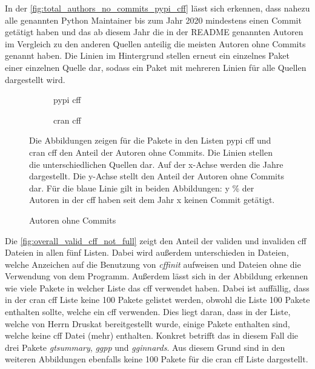 In der \autoref{fig:total_authors_no_commits_pypi_cff} lässt sich erkennen, dass nahezu alle genannten Python Maintainer bis zum Jahr 2020 mindestens einen Commit getätigt haben und das ab diesem Jahr die in der README genannten Autoren im Vergleich zu den anderen Quellen anteilig die meisten Autoren ohne Commits genannt haben.
Die Linien im Hintergrund stellen erneut ein einzelnes Paket einer einzelnen Quelle dar, sodass ein Paket mit mehreren Linien für alle Quellen dargestellt wird.

\begin{figure}
    \begin{subfigure}{.5\textwidth}
        \centering
        
        \caption{\gls{pypi} \gls{cff}}
        \label{fig:total_authors_no_commits_pypi_cff}
    \end{subfigure}%
    \begin{subfigure}{.5\textwidth}
        \centering
        
        \caption{\gls{cran} \gls{cff}}
        \label{fig:total_authors_no_commits_cran_cff}
    \end{subfigure}
    \caption{Autoren ohne Commits}
    \label{fig:total_authors_no_commits}
    \small
    \raggedright
    Die Abbildungen zeigen für die Pakete in den Listen \gls{pypi} \gls{cff} und \gls{cran} \gls{cff} den Anteil der Autoren ohne Commits. Die Linien stellen die unterschiedlichen Quellen dar. Auf der x-Achse werden die Jahre dargestellt. Die y-Achse stellt den Anteil der Autoren ohne Commits dar. Für die blaue Linie gilt in beiden Abbildungen: y \% der Autoren in der \gls{cff} haben seit dem Jahr x keinen Commit getätigt.
\end{figure}

Die \autoref{fig:overall_valid_cff_not_full} zeigt den Anteil der validen und invaliden \gls{cff} Dateien in allen fünf Listen.
Dabei wird außerdem unterschieden in Dateien, welche Anzeichen auf die Benutzung von \emph{cffinit} aufweisen und Dateien ohne die Verwendung von dem Programm.
Außerdem lässt sich in der Abbildung erkennen wie viele Pakete in welcher Liste das \gls{cff} verwendet haben.
Dabei ist auffällig, dass in der \gls{cran} \gls{cff} Liste keine 100 Pakete gelistet werden, obwohl die Liste 100 Pakete enthalten sollte, welche ein \gls{cff} verwenden.
Dies liegt daran, dass in der Liste, welche von Herrn Druskat bereitgestellt wurde, einige Pakete enthalten sind, welche keine \gls{cff} Datei (mehr) enthalten.
Konkret betrifft das in diesem Fall die drei Pakete \emph{gtsummary}, \emph{ggpp} und \emph{gginnards}.
Aus diesem Grund sind in den weiteren Abbildungen ebenfalls keine 100 Pakete für die \gls{cran} \gls{cff} Liste dargestellt.

